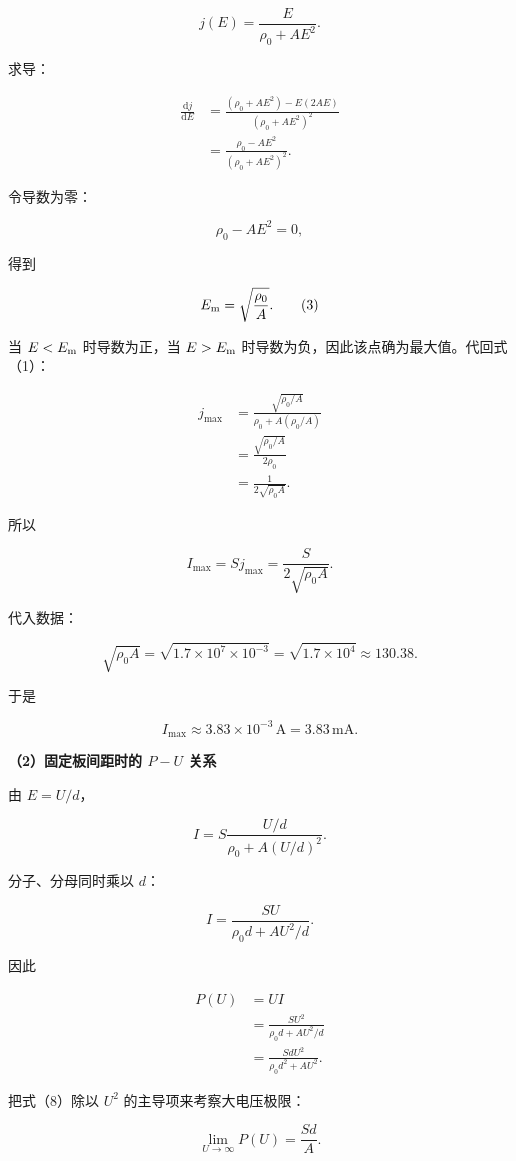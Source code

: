 \documentclass[12pt,a4paper,UTF8]{ctexart}
\begin{document}
\[
j(E)=\frac{E}{\rho_0+AE^2}.
\tag{1}
\]

求导：

\[
\begin{aligned}
\frac{\mathrm dj}{\mathrm dE}
&=\frac{(\rho_0+AE^2)-E(2AE)}
{(\rho_0+AE^2)^2}\\
&=\frac{\rho_0-AE^2}
{(\rho_0+AE^2)^2}.
\end{aligned}
\tag{2}
\]

令导数为零：

\[
\rho_0-AE^2=0,
\]

得到

\[
E_{\rm m}=\sqrt{\frac{\rho_0}{A}}.
\tag{3}
\]

当 \(E<E_{\rm m}\) 时导数为正，当 \(E>E_{\rm m}\)
时导数为负，因此该点确为最大值。代回式（1）：

\[
\begin{aligned}
j_{\max}
&=\frac{\sqrt{\rho_0/A}}
{\rho_0+A(\rho_0/A)}\\
&=\frac{\sqrt{\rho_0/A}}{2\rho_0}\\
&=\frac1{2\sqrt{\rho_0A}}.
\end{aligned}
\tag{4}
\]

所以

\[
I_{\max}=Sj_{\max}
=\frac{S}{2\sqrt{\rho_0A}}.
\tag{5}
\]

代入数据：

\[
\sqrt{\rho_0A}
=\sqrt{1.7\times10^7\times10^{-3}}
=\sqrt{1.7\times10^4}
\approx130.38.
\]

于是

\[
\boxed{I_{\max}\approx3.83\times10^{-3}\,\mathrm A
=3.83\,\mathrm{mA}}.
\tag{6}
\]

\textbf{（2）固定板间距时的 \(P-U\) 关系}

由 \(E=U/d\)，

\[
I
=S\frac{U/d}{\rho_0+A(U/d)^2}.
\]

分子、分母同时乘以 \(d\)：

\[
I=\frac{SU}{\rho_0d+AU^2/d}.
\tag{7}
\]

因此

\[
\begin{aligned}
P(U)
&=UI\\
&=\frac{SU^2}{\rho_0d+AU^2/d}\\
&=\frac{SdU^2}{\rho_0d^2+AU^2}.
\end{aligned}
\tag{8}
\]

把式（8）除以 \(U^2\) 的主导项来考察大电压极限：

\[
\lim_{U\to\infty}P(U)
=\frac{Sd}{A}.
\tag{9}
\]
\end{document}
